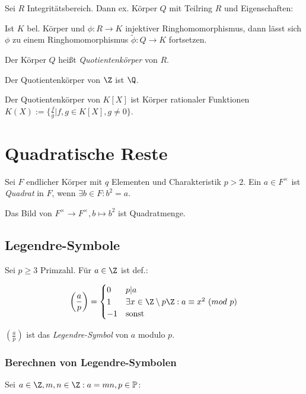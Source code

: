 Sei $R$ Integritätsbereich. Dann ex. Körper $Q$ mit Teilring $R$ und Eigenschaften:

Ist $K$ bel. Körper und $\phi : R \to K$ injektiver Ringhomomorphismus, dann lässt sich $\phi$ zu einem Ringhomomorphismus $\tilde\phi : Q \to K$ fortsetzen.

Der Körper $Q$ heißt \emph{Quotientenkörper} von $R$.

\vspace*{2mm}

Der Quotientenkörper von $\Z$ ist $\Q$.

Der Quotientenkörper von $K[X]$ ist Körper rationaler Funktionen $K(X) := \{ \frac{f}{g} | f, g \in K[X], g \neq 0 \}$.

\section*{Quadratische Reste}

Sei $F$ endlicher Körper mit $q$ Elementen und Charakteristik $p > 2$. Ein $a \in F^\times$ ist \emph{Quadrat} in $F$, wenn $\exists b \in F : b^2 = a$.

Das Bild von $F^\times \to F^\times, b \mapsto b^2$ ist Quadratmenge.

\subsection*{Legendre-Symbole}

\newcommand{\legendre}[2]{\left(\frac{#1}{#2}\right)}

Sei $p \geq 3$ Primzahl. Für $a \in \Z$ ist def.:

\vspace*{-2mm}
\[ \legendre{a}{p} = \begin{cases}
	0  & p | a \\
	1  & \exists x \in \Z \setminus p\Z : a \equiv x^2 \ (mod \ p) \\
	-1 & \text{sonst}
\end{cases} \]

$\legendre{a}{p}$ ist das \emph{Legendre-Symbol} von $a$ modulo $p$.

\pagebreak

\subsubsection*{Berechnen von Legendre-Symbolen}

Sei $a \in \Z, m, n \in \Z : a=mn, p \in \Primes$:

